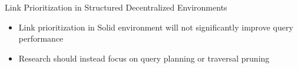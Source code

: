 
\begin{frame}{Link Prioritization in Structured Decentralized Environments}
    \begin{itemize}
        \item Link prioritization in Solid environment will not significantly improve query performance
        \item Research should instead focus on query planning \textcite{hanski2025link} or traversal pruning \textcite{tam2024opportunities}
    \end{itemize}
\end{frame}

